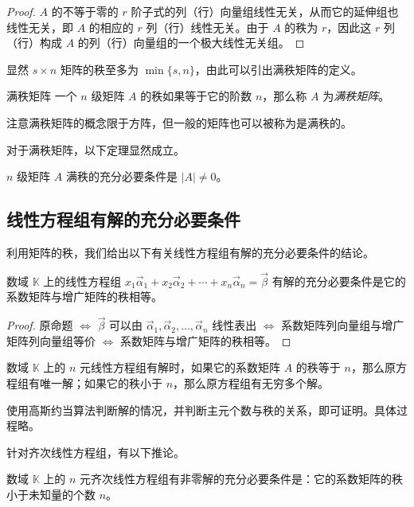 \begin{proof}
	$A$ 的不等于零的 $r$ 阶子式的列（行）向量组线性无关，从而它的延伸组也线性无关，即 $A$ 的相应的 $r$ 列（行）线性无关。由于 $A$ 的秩为 $r$，因此这 $r$ 列（行）构成 $A$ 的列（行）向量组的一个极大线性无关组。
\end{proof}

显然 $s \times n$ 矩阵的秩至多为 $\min \{s, n\}$，由此可以引出满秩矩阵的定义。

\begin{definition}{满秩矩阵}
	一个 $n$ 级矩阵 $A$ 的秩如果等于它的阶数 $n$，那么称 $A$ 为\emph{满秩矩阵}。
\end{definition}

注意满秩矩阵的概念限于方阵，但一般的矩阵也可以被称为是满秩的。

对于满秩矩阵，以下定理显然成立。

\begin{theorem}
	$n$ 级矩阵 $A$ 满秩的充分必要条件是 $|A| \ne 0$。
\end{theorem}

\subsection{线性方程组有解的充分必要条件}

利用矩阵的秩，我们给出以下有关线性方程组有解的充分必要条件的结论。

\begin{theorem}
	数域 $\mathbb K$ 上的线性方程组 $x_1 \vec \alpha_1 + x_2 \vec \alpha_2 + \cdots + x_n \vec \alpha_n = \vec \beta$ 有解的充分必要条件是它的系数矩阵与增广矩阵的秩相等。
\end{theorem}

\begin{proof}
	原命题 $\Longleftrightarrow$ $\vec \beta$ 可以由 $\vec \alpha_1, \vec \alpha_2, \ldots, \vec \alpha_n$ 线性表出 $\Longleftrightarrow$ 系数矩阵列向量组与增广矩阵列向量组等价 $\Longleftrightarrow$ 系数矩阵与增广矩阵的秩相等。
\end{proof}

\begin{theorem}
	数域 $\mathbb K$ 上的 $n$ 元线性方程组有解时，如果它的系数矩阵 $A$ 的秩等于 $n$，那么原方程组有唯一解；如果它的秩小于 $n$，那么原方程组有无穷多个解。
\end{theorem}

使用高斯约当算法判断解的情况，并判断主元个数与秩的关系，即可证明。具体过程略。

针对齐次线性方程组，有以下推论。

\begin{theorem}
	数域 $\mathbb K$ 上的 $n$ 元齐次线性方程组有非零解的充分必要条件是：它的系数矩阵的秩小于未知量的个数 $n$。
\end{theorem}